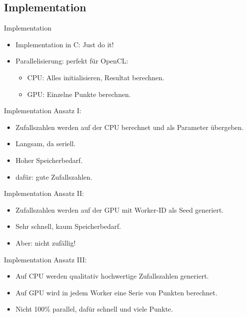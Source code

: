 \documentclass{beamer}
\begin{document}
\subsection{Implementation}
\begin{frame}{Implementation}
	\begin{itemize}
		\item Implementation in C: Just do it!
		\item Parallelisierung: perfekt für OpenCL:
			\begin{itemize}
				\item<2-> CPU: Alles initialisieren, Resultat berechnen.
				\item<2-> GPU: Einzelne Punkte berechnen.
			\end{itemize}
	\end{itemize}
\end{frame}
\begin{frame}{Implementation}
	Ansatz I: \\
	
	\begin{itemize}
		\item Zufallszahlen werden auf der CPU berechnet und als Parameter übergeben.
		\item Langsam, da seriell.
		\item Hoher Speicherbedarf.
		\item dafür: gute Zufallszahlen.
	\end{itemize}
\end{frame}
\begin{frame}{Implementation}
	Ansatz II: \\
	
	\begin{itemize}
		\item Zufallszahlen werden auf der GPU mit Worker-ID als Seed generiert.
		\item Sehr schnell, kaum Speicherbedarf.
		\item Aber: nicht zufällig!
	\end{itemize}
\end{frame}
\begin{frame}{Implementation}
	Ansatz III: \\
	
	\begin{itemize}
		\item Auf CPU werden qualitativ hochwertige Zufallszahlen generiert.
		\item Auf GPU wird in jedem Worker eine Serie von Punkten berechnet.
		\item Nicht 100\% parallel, dafür schnell und viele Punkte.
	\end{itemize}
\end{frame}
\end{document}
